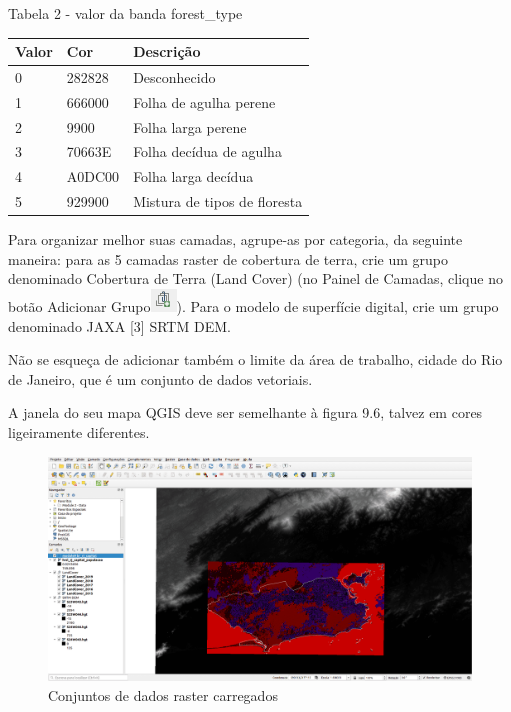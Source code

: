 \documentclass[
]{krantz}
\begin{document}
Tabela 2 - valor da banda forest\_type

\begin{longtable}[]{@{}lll@{}}
\toprule
\textbf{Valor} & \textbf{Cor} & \textbf{Descrição} \\
\midrule
\endhead
0 & 282828 & Desconhecido \\
1 & 666000 & Folha de agulha perene \\
2 & 9900 & Folha larga perene \\
3 & 70663E & Folha decídua de agulha \\
4 & A0DC00 & Folha larga decídua \\
5 & 929900 & Mistura de tipos de floresta \\
\bottomrule
\end{longtable}

Para organizar melhor suas camadas, agrupe-as por categoria, da seguinte maneira: para as 5 camadas raster de cobertura de terra, crie um grupo denominado Cobertura de Terra (Land Cover) (no Painel de Camadas, clique no botão Adicionar Grupo\includegraphics{media/modulo9/add-group-btn.png}). Para o modelo de superfície digital, crie um grupo denominado JAXA {[}3{]} SRTM DEM.

Não se esqueça de adicionar também o limite da área de trabalho, cidade do Rio de Janeiro, que é um conjunto de dados vetoriais.

A janela do seu mapa QGIS deve ser semelhante à figura 9.6, talvez em cores ligeiramente diferentes.

\begin{figure}
\centering
\includegraphics{media/modulo9/fig96.png}
\caption{Conjuntos de dados raster carregados}
\end{figure}
\end{document}
